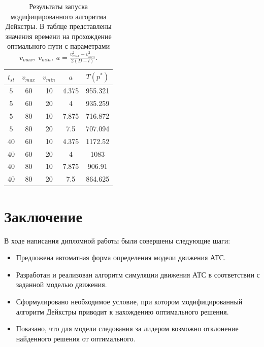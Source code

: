 \documentclass[12pt, a4paper]{article}
\begin{document}
\begin{table}[H]
	\label{tab:res_average}
	\centering
	\begin{tabular}{|c|c|c|c|c|}
		\hline
		\multicolumn{1}{|c|}{ $t_{st}$} & $v_{max}$  & $v_{min}$ & $a$ &  $T(p^*)$ \\ \hline
		\multicolumn{1}{|c|}{$5$}       & 60         & 10        & 4.375 &   955.321         \\ \hline
		\multicolumn{1}{|c|}{$5$}       & 60         & 20        &  4   &     935.259        \\ \hline
		\multicolumn{1}{|c|}{$5$ }      & 80         & 10        &  7.875   &    716.872         \\ \hline
		\multicolumn{1}{|c|}{$5$}       & 80 & 20                  & 7.5 &        707.094           \\ \hline
		\multicolumn{1}{|c|}{$40$}      & 60 & 10                  & 4.375    &  1172.52            \\ \hline
		\multicolumn{1}{|c|}{$40$ }     & 60 & 20                  & 4   &       1083       \\ \hline
		\multicolumn{1}{|c|}{$40$}      & 80 & 10                  & 7.875    &    906.91          \\ \hline
		\multicolumn{1}{|c|}{$40$ }     & 80 & 20                  & 7.5   &       864.625       \\ \hline
		
	\end{tabular}
	\caption{Результаты запуска модифицированного алгоритма Дейкстры. В таблце представлены значения времени на прохождение оптмального пути с параметрами $v_{max}, \; v_{min}, \; a = \frac{v^2_{max}-v^2_{min}}{2(D-l)}$.}
\end{table}

\newpage
\section*{Заключение}

В ходе написания дипломной работы были совершены следующие шаги:

\begin{itemize}
	\item Предложена автоматная форма определения модели движения АТС.
	\item Разработан и реализован алгоритм симуляции движения АТС в соответствии с заданной моделью движения.
	\item Сформулировано необходимое условие, при котором модифицированный алгоритм Дейкстры приводит к нахождению оптимального решения.
	\item Показано, что для модели следования за лидером возможно отклонение найденного решения от оптимального.
\end{itemize}
\end{document}
